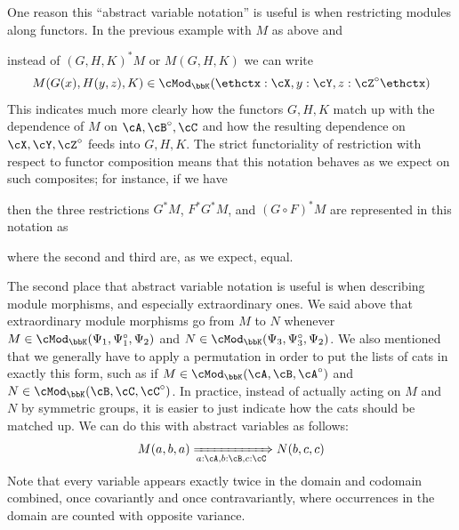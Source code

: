 \documentclass{amsart}
\makeatletter
\newcommand{\A}{\cA}
\newcommand{\B}{\cB}
\newcommand{\C}{\cC}
\newcommand{\X}{\cX}
\newcommand{\Y}{\cY}
\newcommand{\Z}{\cZ}
\newcommand{\K}{\bbK}
\let\mod\cMod
\def\modk{\mod_\K}
\renewcommand{\o}{^{\circ}}
\let\vdash\Longrightarrow
\def\types{\;\vdash\;} %
\def\mtoo#1{\xRightarrow[#1]{}}
\def\modkv#1{\modk({\thctx #1\ethctx})}
\def\thctx#1\ethctx{\@@ctx#1,,}
\def\thincolon#1:#2\endtc{#1\mathord{:}#2}
\def\@@ctx#1,{\@ifmtarg{#1}{\let\next=\relax}{\thincolon#1\endtc\let\next=\@@@ctx}\next}
\def\@@@ctx#1,{\@ifmtarg{#1}{\let\next=\relax}{,\thincolon#1\endtc\let\next=\@@@ctx}\next}
\def\cb{\;\mid\;} %
\makeatother
\begin{document}
One reason this ``abstract variable notation'' is useful is when restricting modules along functors.
In the previous example with $M$ as above and
instead of $(G,H,K)^*M$ or $M(G,H,K)$ we can write
\[ M(G(x),H(y,z),K)\in\modkv{x:\X,y:\Y,z:\Z\o} \]
This indicates much more clearly how the functors $G,H,K$ match up with the dependence of $M$ on $\A,\B\o,\C$ and how the resulting dependence on $\X,\Y,\Z\o$ feeds into $G,H,K$.
The strict functoriality of restriction with respect to functor composition means that this notation behaves as we expect on such composites; for instance, if we have
then the three restrictions $G^*M$, $F^*G^*M$, and $(G\circ F)^*M$ are represented in this notation as
where the second and third are, as we expect, equal.


The second place that abstract variable notation is useful is when describing module morphisms, and especially extraordinary ones.
We said above that extraordinary module morphisms go from $M$ to $N$ whenever $M\in \modk(\Psi_1, \Psi_1\o, \Psi_2)$ and $N\in\modk (\Psi_3, \Psi_3\o, \Psi_2)$.
We also mentioned that we generally have to apply a permutation in order to put the lists of cats in exactly this form, such as if $M\in \modk(\A,\B,\A\o)$ and $N\in \modk(\B,\C,\C\o)$.
In practice, instead of actually acting on $M$ and $N$ by symmetric groups, it is easier to just indicate how the cats should be matched up.
We can do this with abstract variables as follows:
\[ M(a,b,a) \mtoo{a:\A,b:\B,c:\C} N(b,c,c) \]
Note that every variable appears exactly twice in the domain and codomain combined, once covariantly and once contravariantly, where occurrences in the domain are counted with opposite variance.
\end{document}
